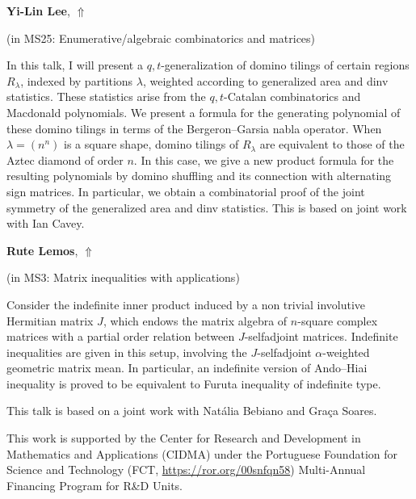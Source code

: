 \documentclass[ILAS2025-program.tex]{subfiles}
\begin{document}
\hypertarget{down0225}{}\begin{ilasabstract}
    
\textbf{Yi-Lin Lee},  \hfill \hyperlink{up0225}{$\Uparrow$}
    
    
(in {\color{mstitle}MS25: Enumerative/algebraic combinatorics and matrices})
        
\mtskip
    In this talk, I will present a $q,t$-generalization of domino tilings of certain regions $R_\lambda$, indexed by partitions $\lambda$, weighted according to generalized area and dinv statistics. These statistics arise from the $q,t$-Catalan combinatorics and Macdonald polynomials. We present a formula for the generating polynomial of these domino tilings in terms of the Bergeron--Garsia nabla operator. When $\lambda = (n^n)$ is a square shape, domino tilings of $R_\lambda$ are equivalent to those of the Aztec diamond of order $n$. In this case, we give a new product formula for the resulting polynomials by domino shuffling and its connection with alternating sign matrices. In particular, we obtain a combinatorial proof of the joint symmetry of the generalized area and dinv statistics. This is based on joint work with Ian Cavey.
\end{ilasabstract}
    

\hypertarget{down0265}{}\begin{ilasabstract}
    
\textbf{Rute Lemos},  \hfill \hyperlink{up0265}{$\Uparrow$}
    
    
(in {\color{mstitle}MS3: Matrix inequalities with applications})
        
\mtskip
    Consider the indefinite inner product induced by a non trivial involutive Hermitian matrix $J$, 
which endows the matrix algebra of $n$-square complex matrices with a partial order relation between $J$-selfadjoint matrices.
Indefinite inequalities are given in this setup, involving the $J$-selfadjoint $\alpha$-weighted geometric matrix mean. 
In particular, an indefinite version of Ando–Hiai inequality is proved to be equivalent to Furuta inequality of indefinite type.

This talk is based on a joint work with Nat\'alia Bebiano and Gra\c ca Soares.

This work is supported by the
Center for Research and Development in Mathematics and Applications (CIDMA) under the
Portuguese Foundation for Science and Technology 
(FCT, \url{https://ror.org/00snfqn58})   
Multi-Annual Financing Program for R\&D Units.
\end{ilasabstract}
    
\end{document}
